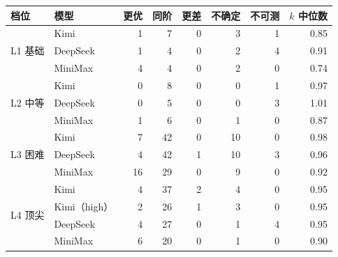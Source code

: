 \begin{tabular}{@{}llrrrrrr@{}}
\toprule
档位 & 模型 & 更优 & 同阶 & 更差 & 不确定 & 不可测 & $k$ 中位数 \\
\midrule
\multirow{3}{*}{L1 基础} & Kimi & 1 & 7 & 0 & 3 & 1 & 0.85 \\
 & DeepSeek & 1 & 4 & 0 & 2 & 4 & 0.91 \\
 & MiniMax & 4 & 4 & 0 & 2 & 0 & 0.74 \\
\cmidrule(lr){1-8}
\multirow{3}{*}{L2 中等} & Kimi & 0 & 8 & 0 & 0 & 1 & 0.97 \\
 & DeepSeek & 0 & 5 & 0 & 0 & 3 & 1.01 \\
 & MiniMax & 1 & 6 & 0 & 1 & 0 & 0.87 \\
\cmidrule(lr){1-8}
\multirow{3}{*}{L3 困难} & Kimi & 7 & 42 & 0 & 10 & 0 & 0.98 \\
 & DeepSeek & 4 & 42 & 1 & 10 & 3 & 0.96 \\
 & MiniMax & 16 & 29 & 0 & 9 & 0 & 0.92 \\
\cmidrule(lr){1-8}
\multirow{4}{*}{L4 顶尖} & Kimi & 4 & 37 & 2 & 4 & 0 & 0.95 \\
 & Kimi（high） & 2 & 26 & 1 & 3 & 0 & 0.95 \\
 & DeepSeek & 4 & 27 & 0 & 1 & 4 & 0.95 \\
 & MiniMax & 6 & 20 & 0 & 1 & 0 & 0.90 \\
\bottomrule
\end{tabular}
